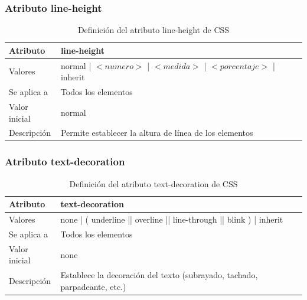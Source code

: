 \documentclass[ucs]{beamer}
\begin{document}
\begin{frame}
\frametitle{Atributo line-height}

\begin{center}
  \begin{table}
   \begin{tabular}{p{1.8cm}p{7.8cm}}
Atributo & \bf{line-height} \\ \hline
Valores& normal | $<numero>$ | $<medida>$ | $<porcentaje>$ | inherit \\ \hline
Se aplica a& Todos los elementos \\ \hline
Valor inicial& normal \\ \hline
Descripción& Permite establecer la altura de línea de los elementos \\ \hline
  \end{tabular}
   \caption{Definición del atributo line-height de CSS}
 \end{table}
\end{center}


\end{frame}



\begin{frame}
\frametitle{Atributo text-decoration}

\begin{center}
  \begin{table}
   \begin{tabular}{p{1.8cm}p{7.8cm}}
Atributo & \bf{text-decoration} \\ \hline
Valores& none | ( underline || overline || line-through || blink ) | inherit \\ \hline
Se aplica a& Todos los elementos \\ \hline
Valor inicial& none \\ \hline
Descripción& Establece la decoración del texto (subrayado, tachado, parpadeante, etc.) \\ \hline
  \end{tabular}
   \caption{Definición del atributo text-decoration de CSS}
 \end{table}
\end{center}


\end{frame}


\end{document}
